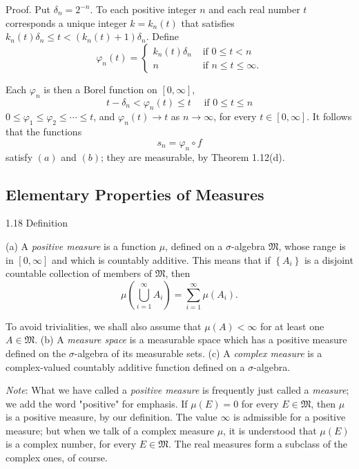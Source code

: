 \documentclass[11pt]{article}
\begin{document}
Proof. Put \(\delta_n=2^{-n}\). To each positive integer \(n\) and each real number \(t\) corresponds a unique integer \(k=k_n(t)\) that satisfies \(k_{n}(t) \delta_n \leq t<(k_{n}(t)+1) \delta_n\). Define
\[\varphi_n(t)= \begin{cases}k_n(t) \delta_n & \text { if } 0 \leq t<n \\ n & \text { if } n \leq t \leq \infty .\end{cases}\]

Each \(\varphi_n\) is then a Borel function on \([0, \infty]\),
\[
t-\delta_n<\varphi_n(t) \leq t \quad \text { if } 0 \leq t \leq n
\]
\(0 \leq \varphi_1 \leq \varphi_2 \leq \cdots \leq t\), and \(\varphi_n(t) \rightarrow t\) as \(n \rightarrow \infty\), for every \(t \in[0, \infty]\). It follows that the functions
\[s_n=\varphi_n \circ f\]
satisfy \((a)\) and \((b)\); they are measurable, by Theorem 1.12(d).
\subsection{Elementary Properties of Measures}
\label{sec:org5c8006e}

\label{org406dc1c}

1.18 Definition

(a) A \emph{positive measure} is a function \(\mu\), defined on a \(\sigma\)-algebra \(\mathfrak{M}\), whose range is in \([0, \infty]\) and which is countably additive. This means that if \(\left\{A_i\right\}\) is a disjoint countable collection of members of \(\mathfrak{M}\), then
\[
\mu\left(\bigcup_{i=1}^{\infty} A_i\right)=\sum_{i=1}^{\infty} \mu\left(A_i\right) .
\]

To avoid trivialities, we shall also assume that \(\mu(A)<\infty\) for at least one \(A \in \mathfrak{M}\).
(b) A \emph{measure space} is a measurable space which has a positive measure defined on the \(\sigma\)-algebra of its measurable sets.
(c) A \emph{complex measure} is a complex-valued countably additive function defined on a \(\sigma\)-algebra.

\emph{Note}: What we have called a \emph{positive measure} is frequently just called a \emph{measure}; we add the word "positive" for emphasis. If \(\mu(E)=0\) for every \(E \in \mathfrak{M}\), then \(\mu\) is a positive measure, by our definition. The value \(\infty\) is admissible for a positive measure; but when we talk of a complex measure \(\mu\), it is understood that \(\mu(E)\) is a complex number, for every \(E \in \mathfrak{M}\). The real measures form a subclass of the complex ones, of course.
\end{document}
